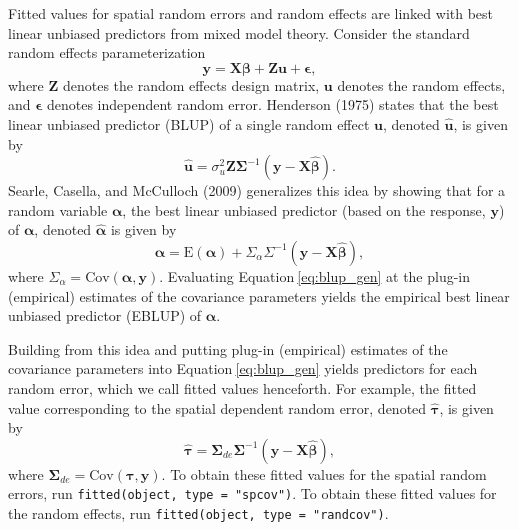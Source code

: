 \documentclass{article}
\begin{document}
Fitted values for spatial random errors and random effects are linked
with best linear unbiased predictors from mixed model theory. Consider
the standard random effects parameterization \begin{equation}
  \mathbf{y} = \mathbf{X} \bm{\beta} + \mathbf{Z} \mathbf{u} + \bm{\epsilon},
\end{equation} where \(\mathbf{Z}\) denotes the random effects design
matrix, \(\mathbf{u}\) denotes the random effects, and \(\bm{\epsilon}\)
denotes independent random error. Henderson (1975) states that the best
linear unbiased predictor (BLUP) of a single random effect
\(\mathbf{u}\), denoted \(\mathbf{\hat{u}}\), is given by
\begin{equation}\label{eq:blup_mm}
  \mathbf{\hat{u}} = \sigma^2_u \mathbf{Z} \mathbf{\Sigma}^{-1}(\mathbf{y} - \mathbf{X} \bm{\hat{\beta}}).
\end{equation} Searle, Casella, and McCulloch (2009) generalizes this
idea by showing that for a random variable \(\bm{\alpha}\), the best
linear unbiased predictor (based on the response, \(\mathbf{y}\)) of
\(\mathbf{\alpha}\), denoted \(\bm{\hat{\alpha}}\) is given by
\begin{equation}\label{eq:blup_gen}
  \bm{\hat{\alpha}} = \text{E}(\bm{\alpha}) + \Sigma_\alpha \Sigma^{-1}(\mathbf{y} - \mathbf{X} \bm{\hat{\beta}}),
\end{equation} where
\(\Sigma_\alpha = \text{Cov}(\bm{\alpha}, \mathbf{y})\). Evaluating
Equation\(~\)\eqref{eq:blup_gen} at the plug-in (empirical) estimates of
the covariance parameters yields the empirical best linear unbiased
predictor (EBLUP) of \(\bm{\alpha}\).

Building from this idea and putting plug-in (empirical) estimates of the
covariance parameters into Equation\(~\)\eqref{eq:blup_gen} yields
predictors for each random error, which we call fitted values
henceforth. For example, the fitted value corresponding to the spatial
dependent random error, denoted \(\bm{\hat{\tau}}\), is given by
\begin{equation}\label{eq:blup_sp}
  \bm{\hat{\tau}} = \mathbf{\Sigma}_{de} \mathbf{\Sigma}^{-1}(\mathbf{y} - \mathbf{X} \bm{\hat{\beta}}),
\end{equation} where
\(\mathbf{\Sigma}_{de} = \text{Cov}(\bm{\tau}, \mathbf{y})\). To obtain
these fitted values for the spatial random errors, run
\texttt{fitted(object,\ type\ =\ "spcov")}. To obtain these fitted
values for the random effects, run
\texttt{fitted(object,\ type\ =\ "randcov")}.
\end{document}
